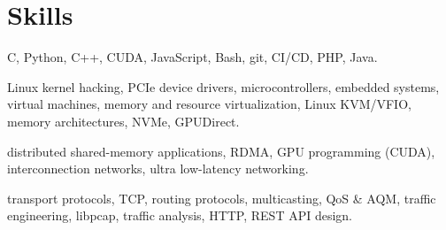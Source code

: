 \section{Skills}
{C, Python, C++, CUDA, JavaScript, Bash, git, CI/CD, PHP, Java.}

{Linux kernel hacking, PCIe device drivers, microcontrollers, embedded systems, virtual machines, memory and resource virtualization, Linux KVM/VFIO, memory architectures, NVMe, GPUDirect.}

{distributed shared-memory applications, RDMA, GPU programming (CUDA), interconnection networks, ultra low-latency networking.}

{transport protocols, TCP, routing protocols, multicasting, QoS \& AQM, traffic engineering, libpcap, traffic analysis, HTTP, REST API design.}

%
%
%
%
